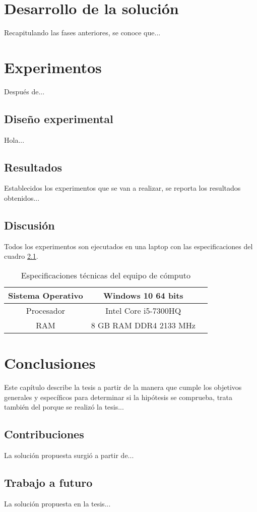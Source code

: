 \chapter{Desarrollo de la solución}
Recapitulando las fases anteriores, se conoce que...


\chapter{Experimentos}
Después de...

\section{Diseño experimental}
Hola...

\section{Resultados}
Establecidos los experimentos que se van a realizar, se reporta los resultados obtenidos...

\section{Discusión}
Todos los experimentos son ejecutados en una laptop con las especificaciones del cuadro \ref{tab:Especificaciones técnicas del PC}.

\begin{table}[H]
	{\centering
		\caption{Especificaciones técnicas del equipo de cómputo}
		\begin{tabular}{|c|c|c|}
			\hline
			Sistema Operativo & Windows 10 64 bits\\
			\hline
			Procesador & Intel Core i5-7300HQ\\
			\hline
			RAM & 8 GB RAM DDR4 2133 MHz\\
			\hline
		\end{tabular}

	\label{tab:Especificaciones técnicas del PC}
	}
\end{table}


\chapter{Conclusiones}
Este capítulo describe la tesis a partir de la manera que cumple los objetivos generales y específicos para determinar si la hipótesis se comprueba, trata también del porque se realizó la tesis...

\clearpage

\section{Contribuciones}
La solución propuesta surgió a partir de...

\section{Trabajo a futuro}
La solución propuesta en la tesis...
